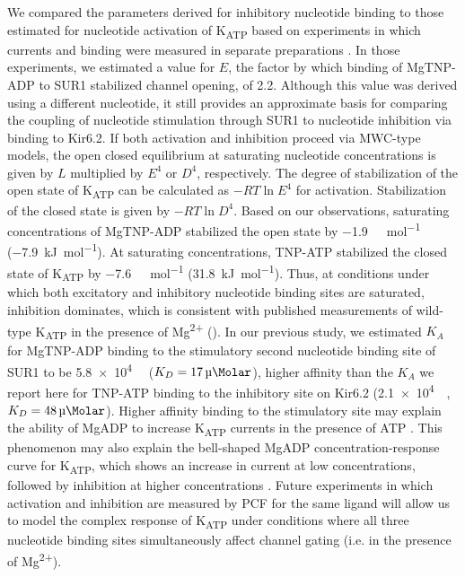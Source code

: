 \documentclass[10pt,lineno, doublespacing]{elife_modified}
\begin{document}
We compared the parameters derived for inhibitory nucleotide binding to those estimated for nucleotide activation of K\textsubscript{ATP} based on experiments in which currents and binding were measured in separate preparations \citep{RN80}.
In those experiments, we estimated a value for $E$, the factor by which binding of MgTNP-ADP to SUR1 stabilized channel opening, of 2.2.
Although this value was derived using a different nucleotide, it still provides an approximate basis for comparing the coupling of nucleotide stimulation through SUR1 to nucleotide inhibition via binding to Kir6.2.
If both activation and inhibition proceed via MWC-type models, the open closed equilibrium at saturating nucleotide concentrations is given by $L$ multiplied by $E^4$ or $D^4$, respectively.
The degree of stabilization of the open state of K\textsubscript{ATP} can be calculated as $-RT\ln{E^4}$ for activation.
Stabilization of the closed state is given by $-RT\ln{D^4}$.
Based on our observations, saturating concentrations of MgTNP-ADP stabilized the open state by \SI{-1.9}{\kilo\Calorie\per\mole} (\SI{-7.9}{\kilo\joule\per\mole}).
At saturating concentrations, TNP-ATP stabilized the closed state of K\textsubscript{ATP} by \SI{-7.6}{\kilo\Calorie\per\mole} (\SI{31.8}{\kilo\joule\per\mole}).
Thus, at conditions under which both excitatory and inhibitory nucleotide binding sites are saturated, inhibition dominates, which is consistent with published measurements of wild-type K\textsubscript{ATP} in the presence of Mg\textsuperscript{2+} (\cite{}).
In our previous study, we estimated $K_A$ for MgTNP-ADP binding to the stimulatory second nucleotide binding site of SUR1 to be \SI{5.8e4}{\per\Molar} ($K_D = \SI{17}{\micro\Molar}$), higher affinity than the $K_A$ we report here for TNP-ATP binding to the inhibitory site on Kir6.2 (\SI{2.1e4}{\per\Molar}, $K_D = \SI{48}{\micro\Molar}$).
Higher affinity binding to the stimulatory site may explain the ability of MgADP to increase K\textsubscript{ATP} currents in the presence of ATP \citep{RN82}.
This phenomenon may also explain the bell-shaped MgADP concentration-response curve for K\textsubscript{ATP}, which shows an increase in current at low concentrations, followed by inhibition at higher concentrations \citep{RN28, RN3}.
Future experiments in which activation and inhibition are measured by PCF for the same ligand will allow us to model the complex response of K\textsubscript{ATP} under conditions where all three nucleotide binding sites simultaneously affect channel gating (i.e. in the presence of Mg\textsuperscript{2+}).
\end{document}
